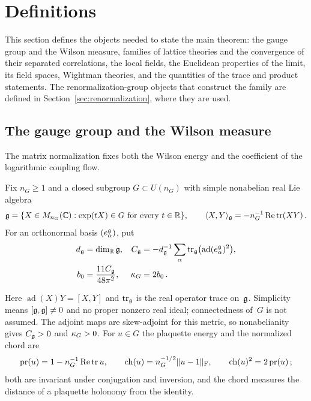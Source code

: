 
\section{Definitions}\label{sec:definitions}

This section defines the objects needed to state the main theorem: the gauge group and the Wilson measure, families of lattice theories and the convergence of their separated correlations, the local fields, the Euclidean properties of the limit, its field spaces, Wightman theories, and the quantities of the trace and product statements. The renormalization-group objects that construct the family are defined in Section~\ref{sec:renormalization}, where they are used.

\subsection{The gauge group and the Wilson measure}\label{sec:wilson}

The matrix normalization fixes both the Wilson energy and the coefficient of the logarithmic coupling flow.

\begin{definition}\label{def:D01}
Fix $n_G\ge1$ and a closed subgroup $G\subset U(n_G)$ with simple nonabelian real Lie algebra
\begin{equation*}
\mathfrak{g}=\{X\in M_{n_G}(\mathbb{C}):\exp(tX)\in G\text{ for every }t\in\mathbb{R}\},
\qquad \langle X,Y\rangle_{\mathfrak{g}}=-n_G^{-1}\operatorname{Re}\operatorname{tr}(XY)\,.
\end{equation*}
For an orthonormal basis $(e_\alpha^{\mathfrak{g}})$, put
\begin{align*}
d_{\mathfrak{g}}&=\dim_{\mathbb{R}}\mathfrak{g},&
C_{\mathfrak{g}}&=-d_{\mathfrak{g}}^{-1}\sum_\alpha\operatorname{tr}_{\mathfrak{g}}\bigl(\operatorname{ad}(e_\alpha^{\mathfrak{g}})^2\bigr),\\
b_0&=\frac{11C_{\mathfrak{g}}}{48\pi^2},& \kappa_G&=2b_0\,.
\end{align*}
\end{definition}

Here $\operatorname{ad}(X)Y=[X,Y]$ and $\operatorname{tr}_{\mathfrak{g}}$ is the real operator trace on~$\mathfrak{g}$. Simplicity means $[\mathfrak{g},\mathfrak{g}]\ne0$ and no proper nonzero real ideal; connectedness of~$G$ is not assumed. The adjoint maps are skew-adjoint for this metric, so nonabelianity gives $C_{\mathfrak{g}}>0$ and $\kappa_G>0$. For $u\in G$ the plaquette energy and the normalized chord are
\begin{equation}\label{eq:I12-price-chord}
\operatorname{pr}(u)=1-n_G^{-1}\operatorname{Re}\operatorname{tr} u,\qquad
\operatorname{ch}(u)=n_G^{-1/2}\|u-1\|_{\rm F},\qquad
\operatorname{ch}(u)^2=2\operatorname{pr}(u)\,;
\end{equation}
both are invariant under conjugation and inversion, and the chord measures the distance of a plaquette holonomy from the identity.

